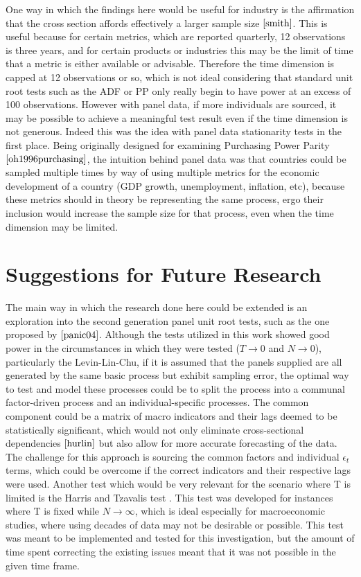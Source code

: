 One way in which the findings here would be useful for industry is the affirmation that the cross section affords effectively a larger sample size $\cite{smith}$. This is useful because for certain metrics, which are reported quarterly, 12 observations is three years, and for certain products or industries this may be the limit of time that a metric is either available or advisable. Therefore the time dimension is capped at 12 observations or so, which is not ideal considering that standard unit root tests such as the ADF or PP only really begin to have power at an excess of 100 observations. However with panel data, if more individuals are sourced, it may be possible to achieve a meaningful test result even if the time dimension is not generous. Indeed this was the idea with panel data stationarity tests in the first place. Being originally designed for examining Purchasing Power Parity $\cite{oh1996purchasing}$, the intuition behind panel data was that countries could be sampled multiple times by way of using multiple metrics for the economic development of a country (GDP growth, unemployment, inflation, etc), because these metrics should in theory be representing the same process, ergo their inclusion would increase the sample size for that process, even when the time dimension may be limited. 



\section{Suggestions for Future Research}

The main way in which the research done here could be extended is an exploration into the second generation panel unit root tests, such as the one proposed by $\cite{panic04}$. Although the tests utilized in this work showed good power in the circumstances in which they were tested ($T \to 0$ and $N \to 0$), particularly the Levin-Lin-Chu, if it is assumed that the panels supplied are all generated by the same basic process but exhibit sampling error, the optimal way to test and model these processes could be to split the process into a communal factor-driven process and an individual-specific processes. The common component could be a matrix of macro indicators and their lags deemed to be statistically significant, which would not only eliminate cross-sectional dependencies $\cite{hurlin}$ but also allow for more accurate forecasting of the data. The challenge for this approach is sourcing the common factors and individual $\epsilon_t$ terms, which could be overcome if the correct indicators and their respective lags were used. Another test which would be very relevant for the scenario where T is limited is the Harris and Tzavalis test \citep{harris1999inference}. This test was developed for instances where T is fixed while $N \to \infty$, which is ideal especially for macroeconomic studies, where using decades of data may not be desirable or possible. This test was meant to be implemented and tested for this investigation, but the amount of time spent correcting the existing issues meant that it was not possible in the given time frame.